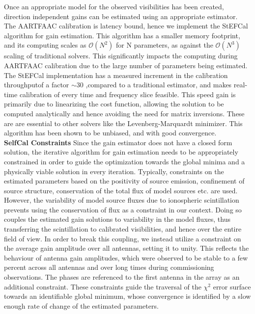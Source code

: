 \documentclass{aa}
\begin{document}
Once  an appropriate  model  for  the observed  visibilities  has been  created,
direction independent gains can be estimated using an appropriate estimator. The
AARTFAAC   calibration    is   latency    bound,   hence   we    implement   the
StEFCal\citep{salvini2013stef}  algorithm for  gain estimation.   This algorithm
has a smaller memory footprint, and its computing scales as $\mathcal{O}(N^{2})$
for  N parameters, as  against the  $\mathcal{O}(N^{3})$ scaling  of traditional
solvers. This  significantly impacts  the computing during  AARTFAAC calibration
due  to   the  large  number   of  parameters  being  estimated.    The  StEFCal
implementation has a measured increment in the calibration throughputof a factor
$\sim$30 \citep{salvini2013stef},compared to a traditional estimator, and  makes
real-time calibration  of every time  and frequency slice feasible.   This speed
gain is primarily due to linearizing the cost function, allowing the solution to
be  computed analytically  and hence  avoiding the  need for  matrix inversions.
These are are essential to other solvers like the Levenberg-Marquardt minimizer.
This algorithm has been shown to be unbiased, and with good convergence.\\
\textbf{SelfCal Constraints}  Since the  gain estimator does  not have  a closed
form  solution,  the  iterative  algorithm  for  gain  estimation  needs  to  be
appropriately constrained in order to  guide the optimization towards the global
minima  and  a  physically   viable  solution  in  every  iteration.  Typically,
constraints  on the  estimated  parameters  based on  the  positivity of  source
emission, confinement  of source  structure, conservation of  the total  flux of
model sources  etc. are used.  However,  the variability of  model source fluxes
due to  ionospheric scintillation prevents using  the conservation of  flux as a
constraint in  our context.   Doing so couples  the estimated gain  solutions to
variability  in  the  model  fluxes,  thus  transferring  the  scintillation  to
calibrated visibilities, and  hence over the entire field of  view.  In order to
break  this  coupling, we  instead  utilize a  constraint  on  the average  gain
amplitude over all antennas, setting it to unity. This reflects the behaviour of
antenna  gain amplitudes,  which were  observed to  be stable  to a  few percent
across all antennas and over  long times during commissioning observations.  The
phases  are referenced  to  the first  antenna  in the  array  as an  additional
constraint.   These constraints  guide  the traversal  of  the $\chi^{2}$  error
surface towards an identifiable  global minimum, whose convergence is identified
by a slow enough rate of change of the estimated parameters.
\end{document}
